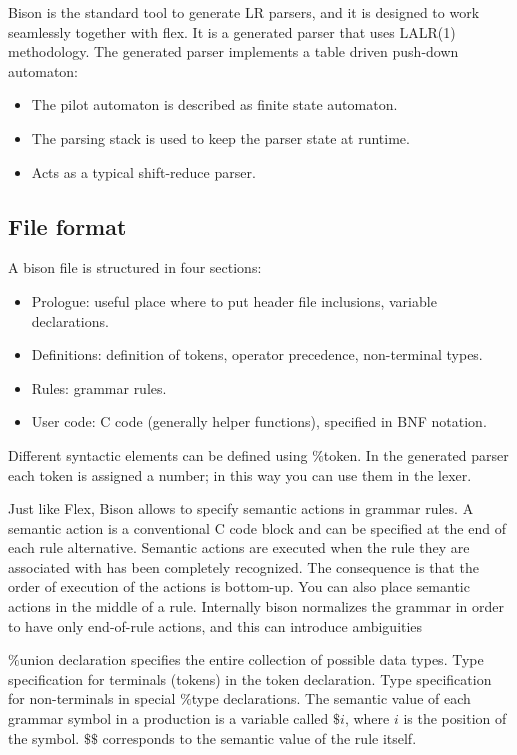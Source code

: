 \documentclass[12pt, a4paper]{report}
\newtheorem[style=M, bodystyle=\normalfont]{operation}{Operation}
\newtheorem[style=M, bodystyle=\normalfont]{theorem}{Theorem}
\newtheorem[style=M, bodystyle=\normalfont]{corollary}{Corollary}
\newtheorem[style=M, bodystyle=\normalfont]{lemma}{Lemma}
\newtheorem[style=M, bodystyle=\normalfont]{definition}{Definition}
\begin{document}
        Bison is the standard tool to generate LR parsers, and it is designed to work seamlessly together with flex. It is a generated parser that uses LALR(1) methodology.
        The generated parser implements a table driven push-down automaton:
        \begin{itemize}
            \item The pilot automaton is described as finite state automaton.
            \item The parsing stack is used to keep the parser state at runtime.
            \item Acts as a typical shift-reduce parser.
        \end{itemize}

        \subsection{File format}
        A bison file is structured in four sections:
        \begin{itemize}
            \item Prologue: useful place where to put header file inclusions, variable declarations. 
            \item Definitions: definition of tokens, operator precedence, non-terminal types. 
            \item Rules: grammar rules. 
            \item User code: C code (generally helper functions), specified in BNF notation.
        \end{itemize}
        Different syntactic elements can be defined using $\%$token. In the generated parser each token is assigned a number; in this way you can use them in the lexer. 
        
        Just like Flex, Bison allows to specify semantic actions in grammar rules. A semantic action is a conventional C code block and can be specified at the end of 
        each rule alternative. Semantic actions are executed when the rule they are associated with has been completely recognized. The consequence is that the order of 
        execution of the actions is bottom-up. You can also place semantic actions in the middle of a rule. Internally bison normalizes the grammar in order to have only
        end-of-rule actions, and this can introduce ambiguities
        
        $\%$union declaration specifies the entire collection of possible data types. Type specification for terminals (tokens) in the token declaration. Type 
        specification for non-terminals in special $\%$type declarations. The semantic value of each grammar symbol in a production is a variable called $\$i$, where 
        $i$ is the position of the symbol. $\$\$$ corresponds to the semantic value of the rule itself. 
\end{document}
